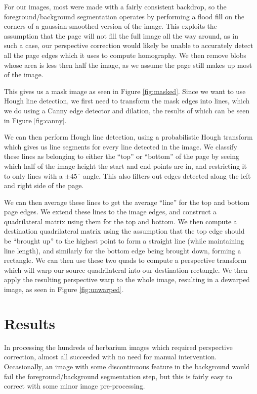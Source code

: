 \documentclass[runningheads,a4paper]{llncs}
\begin{document}
For our images, most were made with a fairly consistent backdrop, so the foreground/background segmentation operates by performing a flood fill on the corners of a gaussian-smoothed version of the image. This exploits the assumption that the page will not fill the full image all the way around, as in such a case, our perspective correction would likely be unable to accurately detect all the page edges which it uses to compute homography. We then remove blobs whose area is less then half the image, as we assume the page still makes up most of the image. 

This gives us a mask image as seen in Figure \ref{fig:masked}. Since we want to use Hough line detection, we first need to transform the mask edges into lines, which we do using a Canny edge detector and dilation, the results of which can be seen in Figure \ref{fig:canny}.

We can then perform Hough line detection, using a probabilistic Hough transform which gives us line segments for every line detected in the image. We classify these lines as belonging to either the “top” or “bottom” of the page by seeing which half of the image height the start and end points are in, and restricting it to only lines with a $\pm 45\,^{\circ}$ angle. This also filters out edges detected along the left and right side of the page.

We can then average these lines to get the average “line” for the top and bottom page edges. We extend these lines to the image edges, and construct a quadrilateral matrix using them for the top and bottom. We then compute a destination quadrilateral matrix using the assumption that the top edge should be “brought up” to the highest point to form a straight line (while maintaining line length), and similarly for the bottom edge being brought down, forming a rectangle. We can then use these two quads to compute a perspective transform which will warp our source quadrilateral into our destination rectangle. We then apply the resulting perspective warp to the whole image, resulting in a dewarped image, as seen in Figure \ref{fig:unwarped}.

\section{Results}

In processing the hundreds of herbarium images which required perspective correction, almost all succeeded
with no need for manual intervention. Occasionally, an image with some discontinuous feature in the background
would fail the foreground/background segmentation step, but this is fairly easy to correct with some minor
image pre-processing.
\end{document}
